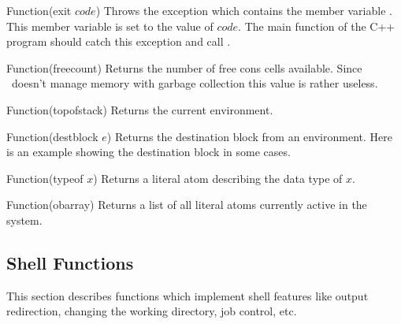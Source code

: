 \begin{defun}{Function}{(exit $code$)}
  Throws the exception  which contains the
  member variable .  This member variable is set to
  the value of $code$. The main function of the C++ program should
  catch this exception and call .
\end{defun}

\begin{defun}{Function}{(freecount)}
  Returns the number of free cons cells available. Since
  \lips\ doesn't manage memory with garbage collection this value is
  rather useless.
\end{defun}

\begin{defun}{Function}{(topofstack)}
  Returns the current environment.
\end{defun}

\begin{defun}{Function}{(destblock $e$)}
  Returns the destination block from an environment. Here is an
  example showing the destination block in some cases.
  \begin{examples}
  \end{examples}
\end{defun}


\begin{defun}{Function}{(typeof $x$)}
  Returns a literal atom describing the data type of $x$.

  \begin{examples}
  \end{examples}

\end{defun}

\begin{defun}{Function}{(obarray)}
  Returns a list of all literal atoms
  currently active in the system.
\end{defun}

\subsection{Shell Functions}
This section describes functions which implement shell features like
output redirection, changing the working directory, job control, etc.

